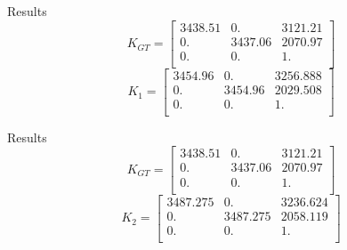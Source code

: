 \documentclass{beamer}
\begin{document}
{
	\begin{frame}[plain]
	\end{frame}
}
\begin{frame}{Results}
	\[
	K_{GT} = 
	\begin{bmatrix}
	3438.51 &   0. &  3121.21 \\
	0. &  3437.06 & 2070.97 \\
	0. &     0.   &   1.  \\
	\end{bmatrix}
	\]
	\[
	K_{1} = 
	\begin{bmatrix}	
    3454.96 &   0. &   3256.888 \\
    0. &     3454.96 & 2029.508 \\
	0.    & 0. &     1.  \\
	\end{bmatrix}
	\]
\end{frame}
{
	\begin{frame}[plain]
	\end{frame}
}

\begin{frame}{Results}
	\[
	K_{GT} = 
	\begin{bmatrix}
	3438.51 &   0. &  3121.21 \\
	0. &  3437.06 & 2070.97 \\
	0. &     0.   &   1.  \\
	\end{bmatrix}
	\]
	\[
	K_{2} = 
	\begin{bmatrix}	
	3487.275     & 0.  &   3236.624 \\
	0. &   3487.275 & 2058.119 \\
	0.    & 0. &     1.  \\
	\end{bmatrix}
	\]
\end{frame}
\end{document}
